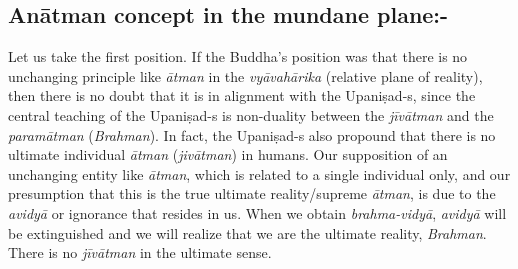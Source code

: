 \vspace{-.3cm}

\subsection*{Anātman concept in the mundane plane:-}

Let us take the first position. If the Buddha’s position was that there is no unchanging principle like \textit{ātman} in the \textit{vyāvahārika} (relative plane of reality), then there is no doubt that it is in alignment with the Upaniṣad-s, since the central teaching of the Upaniṣad-s is non-duality between the \textit{jīvātman} and the \textit{paramātman} (\textit{Brahman}). In fact, the Upaniṣad-s also propound that there is no ultimate individual \textit{ātman} (\textit{jivātman}) in humans. Our supposition of an unchanging entity like \textit{ātman}, which is related to a single individual only, and our presumption that this is the true ultimate reality/supreme \textit{ātman}, is due to the \textit{avidyā} or ignorance that resides in us. When we obtain \textit{brahma-vidyā}, \textit{avidyā} will be extinguished and we will realize that we are the ultimate reality, \textit{Brahman}. There is no \textit{jīvātman} in the ultimate sense.

